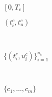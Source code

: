 \documentclass{article}
\begin{document}
$[0, T_c]$

$(t_i^c, t_u^c)$

\

$\{ (t_i^c, u_i^c) \}_{i = 1}^{n_c}$

\

$\{ c_1, \ldots, c_m \}$

\maketitle
\end{document}
